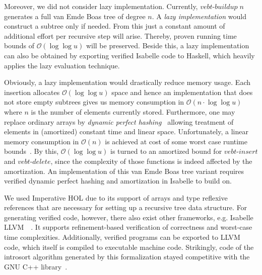 \documentclass[11pt,a4paper]{article}
\begin{document}
Moreover, we did not consider lazy implementation.
Currently, $vebt\text{-}buildup \; n$ generates a full van Emde Boas tree of degree $n$. A \textit{lazy implementation} would construct a subtree only if needed. 
From this just a constant amount of additional effort per recursive step will arise. Thereby, proven running time bounds of $\mathcal{O}(\log \log u)$ will be preserved.
 Beside this, a lazy implementation can also be obtained by exporting verified Isabelle code to Haskell, which heavily applies the lazy evaluation technique.

Obviously, a lazy implementation would drastically reduce memory usage.
Each insertion allocates $\mathcal{O}(\log \log u)$ space and hence an implementation that does not store empty subtrees gives us memory consumption in $\mathcal{O}(n \cdot \log \log u)$ where $n$ is the number of elements currently stored.
 Furthermore, one may replace ordinary arrays by \textit{dynamic perfect hashing}~\cite{dynhash} allowing treatment of elements in (amortized) constant time and linear space. 
 Unfortunately, a linear memory consumption in $\mathcal{O}(n)$ is achieved at cost of some worst case runtime bounds~\cite{funalgdata}.
  By this, $\mathcal{O}(\log \log u)$ is turned to an amortized bound for $vebt\text{-}insert$ and $vebt\text{-}delete$, since the complexity of those functions is indeed affected by the amortization. 
  An implementation of this van Emde Boas tree variant requires verified dynamic perfect hashing and amortization in Isabelle to build on.

  We used Imperative HOL due to its support of arrays and type reflexive references that are necessary for setting up a recursive tree data structure.
 For generating verified code, however, there also exist other frameworks, e.g. Isabelle LLVM~\cite{8f77891e4e7647feb9515038709bc165}~\cite{llvm}. It supports refinement-based verification of correctness and worst-case time complexities. 
 Additionally, verified programs can be exported to LLVM code, which itself is compiled to executable machine code. Strikingly, code of the introsort algorithm generated by this formalization stayed competitive with the GNU C++ library~\cite{llvm}. 
\pagebreak
\printbibliography{}
\end{document}
